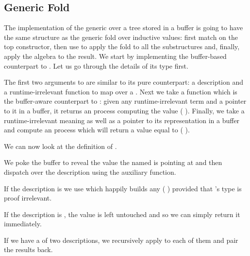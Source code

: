 
\subsection{Generic Fold}\label{sec:bufferfold}

The implementation of the generic  over a tree stored
in a buffer is going to have the same structure as the generic fold over
inductive values: first match on the top constructor, then use 
to apply the fold to all the substructures and, finally, apply the algebra to
the result.
%
We start by implementing the buffer-based counterpart to .
Let us go through the details of its type first.


The first two arguments to  are similar to its pure
counterpart: a description  and a runtime-irrelevant function
 to map over a .
%
Next we take a function which is the buffer-aware counterpart to :
given any runtime-irrelevant term  and a pointer to it in a buffer,
it returns an  process computing the value ( ).
%
Finally, we take a runtime-irrelevant meaning 
as well as a pointer to its representation in a buffer and compute
an  process which will return a value equal to
(   ).

We can now look at the definition of .


We poke the buffer to reveal the value the 
named  is pointing at and then dispatch over the description
 using the  auxiliary function.

If the description is  we use 
which happily builds any ( ) provided
that 's type is proof irrelevant.

If the description is , the value is left untouched and so
we can simply return it immediately.

If we have a  of two descriptions, we recursively apply
 to each of them and pair the results back.

